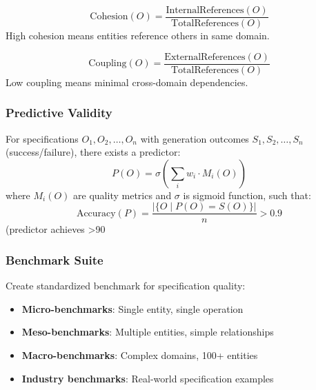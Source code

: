 \begin{definition}
    \begin{equation}
        \text{Cohesion}(O) = \frac{\text{InternalReferences}(O)}{\text{TotalReferences}(O)}
    \end{equation}
    High cohesion means entities reference others in same domain.
\end{definition}

\begin{definition}
    \begin{equation}
        \text{Coupling}(O) = \frac{\text{ExternalReferences}(O)}{\text{TotalReferences}(O)}
    \end{equation}
    Low coupling means minimal cross-domain dependencies.
\end{definition}

\subsubsection{Predictive Validity}

\begin{theorem}
    For specifications $O_1, O_2, \ldots, O_n$ with generation outcomes $S_1, S_2, \ldots, S_n$ (success/failure), there exists a predictor:
    \begin{equation}
        P(O) = \sigma\left(\sum_{i} w_i \cdot M_i(O)\right)
    \end{equation}
    where $M_i(O)$ are quality metrics and $\sigma$ is sigmoid function, such that:
    \begin{equation}
        \text{Accuracy}(P) = \frac{|\{O \mid P(O) = S(O)\}|}{n} > 0.9
    \end{equation}
    (predictor achieves >90%
\end{theorem}

\subsubsection{Benchmark Suite}

Create standardized benchmark for specification quality:

\begin{itemize}
    \item \textbf{Micro-benchmarks}: Single entity, single operation
    \item \textbf{Meso-benchmarks}: Multiple entities, simple relationships
    \item \textbf{Macro-benchmarks}: Complex domains, 100+ entities
    \item \textbf{Industry benchmarks}: Real-world specification examples
\end{itemize}

